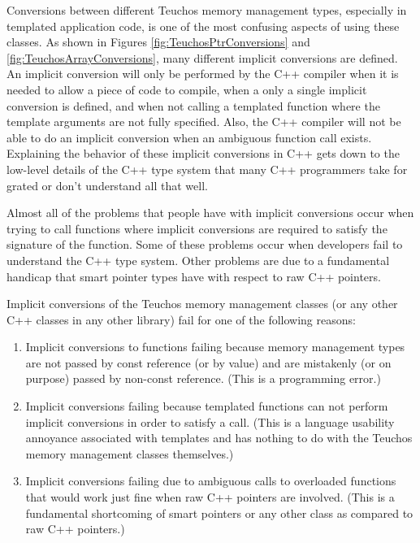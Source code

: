 \documentclass[pdf,ps2pdf,11pt]{SANDreport}
\begin{document}
Conversions between different Teuchos memory management types,
especially in templated application code, is one of the most confusing
aspects of using these classes.  As shown in Figures
{}\ref{fig:TeuchosPtrConversions} and
{}\ref{fig:TeuchosArrayConversions}, many different implicit
conversions are defined.  An implicit conversion will only be
performed by the C++ compiler when it is needed to allow a piece of
code to compile, when a only a single implicit conversion is defined,
and when not calling a templated function where the template arguments
are not fully specified.  Also, the C++ compiler will not be able to
do an implicit conversion when an ambiguous function call exists.
Explaining the behavior of these implicit conversions in C++ gets down
to the low-level details of the C++ type system that many C++
programmers take for grated or don't understand all that well.

Almost all of the problems that people have with implicit conversions
occur when trying to call functions where implicit conversions are
required to satisfy the signature of the function.  Some of these
problems occur when developers fail to understand the C++ type system.
Other problems are due to a fundamental handicap that smart pointer
types have with respect to raw C++ pointers.

Implicit conversions of the Teuchos memory management classes (or any
other C++ classes in any other library) fail for one of the following
reasons:

\begin{enumerate}

{}\item{}Implicit conversions to functions failing because memory
management types are not passed by const reference (or by value) and
are mistakenly (or on purpose) passed by non-const reference. (This is
a programming error.)

{}\item{}Implicit conversions failing because templated functions can
not perform implicit conversions in order to satisfy a call. (This is
a language usability annoyance associated with templates and has
nothing to do with the Teuchos memory management classes themselves.)

{}\item{}Implicit conversions failing due to ambiguous calls to
overloaded functions that would work just fine when raw C++ pointers
are involved. (This is a fundamental shortcoming of smart pointers or
any other class as compared to raw C++ pointers.)

\end{enumerate}
\end{document}
